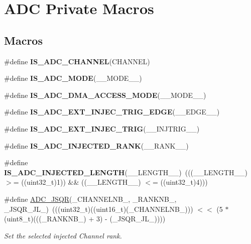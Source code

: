 \hypertarget{group___a_d_c_ex___private___macros}{}\section{A\+DC Private Macros}
\label{group___a_d_c_ex___private___macros}
\subsection*{Macros}
\begin{DoxyCompactItemize}
\item 
\#define {\bfseries I\+S\+\_\+\+A\+D\+C\+\_\+\+C\+H\+A\+N\+N\+EL}(C\+H\+A\+N\+N\+EL)
\item 
\#define {\bfseries I\+S\+\_\+\+A\+D\+C\+\_\+\+M\+O\+DE}(\+\_\+\+\_\+\+M\+O\+D\+E\+\_\+\+\_\+)
\item 
\#define {\bfseries I\+S\+\_\+\+A\+D\+C\+\_\+\+D\+M\+A\+\_\+\+A\+C\+C\+E\+S\+S\+\_\+\+M\+O\+DE}(\+\_\+\+\_\+\+M\+O\+D\+E\+\_\+\+\_\+)
\item 
\#define {\bfseries I\+S\+\_\+\+A\+D\+C\+\_\+\+E\+X\+T\+\_\+\+I\+N\+J\+E\+C\+\_\+\+T\+R\+I\+G\+\_\+\+E\+D\+GE}(\+\_\+\+\_\+\+E\+D\+G\+E\+\_\+\+\_\+)
\item 
\#define {\bfseries I\+S\+\_\+\+A\+D\+C\+\_\+\+E\+X\+T\+\_\+\+I\+N\+J\+E\+C\+\_\+\+T\+R\+IG}(\+\_\+\+\_\+\+I\+N\+J\+T\+R\+I\+G\+\_\+\+\_\+)
\item 
\#define {\bfseries I\+S\+\_\+\+A\+D\+C\+\_\+\+I\+N\+J\+E\+C\+T\+E\+D\+\_\+\+R\+A\+NK}(\+\_\+\+\_\+\+R\+A\+N\+K\+\_\+\+\_\+)
\item 
\mbox{\label{group___a_d_c_ex___private___macros_gaa5050427278d3365405f1297638ca936}} 
\#define {\bfseries I\+S\+\_\+\+A\+D\+C\+\_\+\+I\+N\+J\+E\+C\+T\+E\+D\+\_\+\+L\+E\+N\+G\+TH}(\+\_\+\+\_\+\+L\+E\+N\+G\+T\+H\+\_\+\+\_\+)~(((\+\_\+\+\_\+\+L\+E\+N\+G\+T\+H\+\_\+\+\_\+) $>$= ((uint32\+\_\+t)1)) \&\& ((\+\_\+\+\_\+\+L\+E\+N\+G\+T\+H\+\_\+\+\_\+) $<$= ((uint32\+\_\+t)4)))
\item 
\#define \mbox{\hyperlink{group___a_d_c_ex___private___macros_gaa40c3e803cf20a8aebc3735a714606ad}{A\+D\+C\+\_\+\+J\+S\+QR}}(\+\_\+\+C\+H\+A\+N\+N\+E\+L\+N\+B\+\_\+,  \+\_\+\+R\+A\+N\+K\+N\+B\+\_\+,  \+\_\+\+J\+S\+Q\+R\+\_\+\+J\+L\+\_\+)~(((uint32\+\_\+t)((uint16\+\_\+t)(\+\_\+\+C\+H\+A\+N\+N\+E\+L\+N\+B\+\_\+))) $<$$<$ (5 $\ast$ (uint8\+\_\+t)(((\+\_\+\+R\+A\+N\+K\+N\+B\+\_\+) + 3) -\/ (\+\_\+\+J\+S\+Q\+R\+\_\+\+J\+L\+\_\+))))
\begin{DoxyCompactList}\small\item\em Set the selected injected Channel rank. \end{DoxyCompactList}\end{DoxyCompactItemize}


